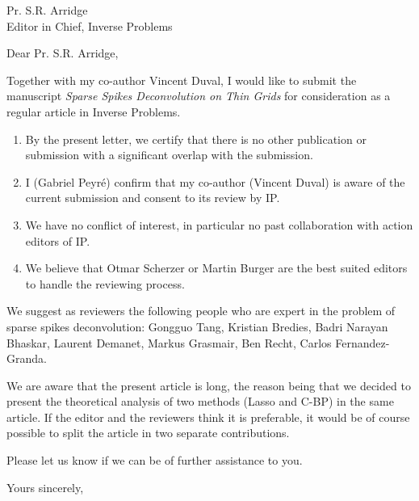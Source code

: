 \documentclass{letter}[11pt]
\begin{document}
\begin{letter}{Pr. S.R. Arridge \\
Editor in Chief, Inverse Problems \\
}

\opening{Dear Pr. S.R. Arridge,}

Together with my co-author Vincent Duval, I would like to submit the manuscript \emph{Sparse Spikes Deconvolution on Thin Grids} for consideration as a regular article in Inverse Problems. 

\medskip

\begin{enumerate}
	\item By the present letter, we certify that there is no other publication or submission with a significant overlap with the submission.
	\item I (Gabriel Peyr\'e) confirm  that my co-author (Vincent Duval) is aware of the current submission and consent to its review by IP.
	\item We have no conflict of interest, in particular no past collaboration with action editors of IP. 
	\item We believe that Otmar Scherzer or Martin Burger are the best suited editors to handle the reviewing process.
\end{enumerate}

\medskip

We suggest as reviewers the following people who are expert in the problem of sparse spikes deconvolution: Gongguo Tang, Kristian Bredies, Badri Narayan Bhaskar, Laurent Demanet, Markus Grasmair, Ben Recht, Carlos Fernandez-Granda. 

\medskip

We are aware that the present article is long, the reason being that we decided to present the theoretical analysis of two methods (Lasso and C-BP) in the same article. If the editor and the reviewers think it is preferable, it would be of course possible to split the article in two separate contributions. 

\medskip

Please let us know if we can be of further assistance to you.

\closing{Yours sincerely,} 



\end{letter}
\end{document}

